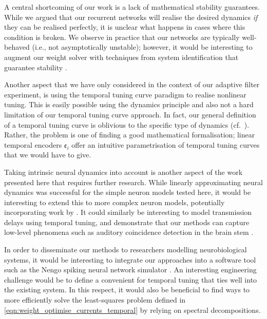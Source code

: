 A central shortcoming of our work is a lack of mathematical stability guarantees.
While we argued that our recurrent networks will realise the desired dynamics \emph{if} they can be realised perfectly, it is unclear what happens in cases where this condition is broken.
We observe in practice that our networks are typically well-behaved (i.e., not asymptotically unstable); however, it would be interesting to augment our weight solver with techniques from system identification that guarantee stability \citep[cf.][]{verhaegen2007filtering}.

Another aspect that we have only considered in the context of our adaptive filter experiment, is using the temporal tuning curve paradigm to realise nonlinear tuning.
This is easily possible using the \NEF dynamics principle \citep[Chapter~8]{eliasmith2003neural} and also not a hard limitation of our temporal tuning curve approach.
In fact, our general definition of a temporal tuning curve is oblivious to the specific type of dynamics (cf.~).
Rather, the problem is one of finding a good mathematical formalisation; linear temporal encoders $\mathfrak{e}_i$ offer an intuitive parametrisation of temporal tuning curves that we would have to give.

Taking intrinsic neural dynamics into account is another aspect of the work presented here that requires further research.
While linearly approximating neural dynamics was successful for the simple neuron models tested here, it would be interesting to extend this to more complex neuron models, potentially incorporating work by \citet{duggins2017incorporating}.
It could similarly be interesting to model transmission delays using temporal tuning, and demonstrate that our methods can capture low-level phenomena such as auditory coincidence detection in the brain stem \citep[Chapter~31]{kandel2012principles}.

In order to disseminate our methods to researchers modelling neurobiological systems, it would be interesting to integrate our approaches into a software tool such as the Nengo spiking neural network simulator \citep{bekolay2014nengo}.
An interesting engineering challenge would be to define a convenient \API for temporal tuning that ties well into the existing system.
In this respect, it would also be beneficial to find ways to more efficiently solve the least-squares problem defined in \cref{eqn:weight_optimise_currents_temporal} by relying on spectral decompositions.
